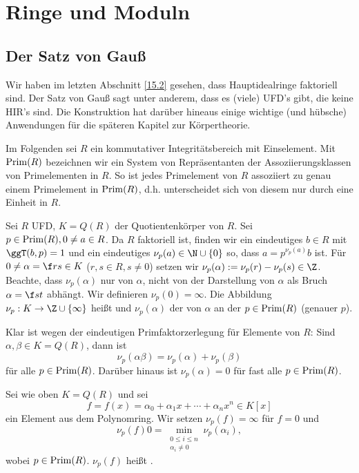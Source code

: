 \chapter{Ringe und Moduln}


\setcounter{section}{2}
\section{Der Satz von Gauß}

Wir haben im letzten Abschnitt \ref{15.2} gesehen, dass Hauptidealringe faktoriell sind.
Der Satz von Gauß sagt unter anderem, dass es (viele) UFD's gibt, die keine HIR's sind.
Die Konstruktion hat darüber hineaus einige wichtige (und hübsche) Anwendungen für die späteren Kapitel zur Körpertheorie.

Im Folgenden sei $R$ ein kommutativer Integritätsbereich mit Einselement.
Mit $\operatorname{Prim}(R)$ bezeichnen wir ein System von Repräsentanten der Assoziierungsklassen von Primelementen in $R$.
So ist jedes Primelement von $R$ assoziiert zu genau einem Primelement in $\operatorname{Prim}(R)$, d.h. unterscheidet sich von diesem nur durch eine Einheit in $R$.

\begin{df} \label{15.3-1}
	Sei $R$ UFD, $K = Q(R)$ der Quotientenkörper von $R$.
	Sei $p \in \operatorname{Prim}(R), 0 \neq a \in R$.
	Da $R$ faktoriell ist, finden wir ein eindeutiges $b \in R$ mit $\ggT(b,p) = 1$ und ein eindeutiges $\nu_p(a) \in \N \cup \{0\}$ so, dass $a = p^{\nu_p(a)} b$ ist.
	Für $0 \neq \alpha = \f rs \in K$ ($r, s \in R, s \neq 0$) setzen wir $\nu_p(\alpha) := \nu_p(r) - \nu_p(s) \in \Z$.
	Beachte, dass $\nu_p(\alpha)$ nur von $\alpha$, nicht von der Darstellung von $\alpha$ als Bruch $\alpha = \f st$ abhängt.
	Wir definieren $\nu_p(0) = \infty$.
	Die Abbildung $\nu_p: K \to \Z \cup \{\infty\}$ heißt  und $\nu_p(\alpha)$ der  von $\alpha$ an der  $p\in \operatorname{Prim}(R)$ (genauer  $p$).

	Klar ist wegen der eindeutigen Primfaktorzerlegung für Elemente von $R$:
	Sind $\alpha, \beta \in K = Q(R)$, dann ist
	\[
		\nu_p(\alpha \beta) = \nu_p(\alpha) + \nu_p(\beta)
	\]
	für alle $p \in \operatorname{Prim}(R)$.
	Darüber hinaus ist $\nu_p(\alpha) = 0$ für fast alle $p \in \operatorname{Prim}(R)$.
\end{df}

\begin{df} \label{15.3-2}
	Sei wie oben $K = Q(R)$ und sei
	\[
		f = f(x) = \alpha_0 + \alpha_1 x + \dotsb + \alpha_n x^n \in K[x]
	\]
	ein Element aus dem Polynomring.
	Wir setzen $\nu_p(f) = \infty$ für $f = 0$ und
	\[
		\nu_p(f)0= \min_{\substack{0\le i \le n \\ \alpha_i \neq 0}} \nu_p(\alpha_i),
	\]
	wobei $p \in \operatorname{Prim}(R)$.
	$\nu_p(f)$ heißt .
\end{df}

